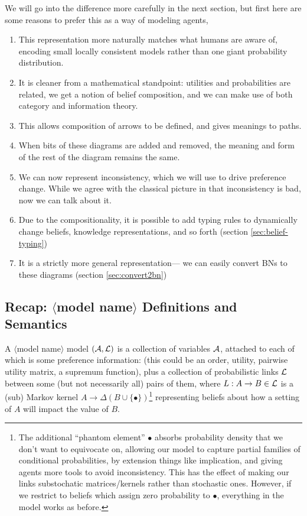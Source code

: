 \documentclass{article}
\newcommand\modelname{{\color{green!50!black}$\langle$model name$\rangle$ }}
\begin{document}
	We will go into the difference more carefully in the next section, but first here are some reasons to prefer this as a way of modeling agents,%
	
	\begin{enumerate}[nosep]
		\item This representation more naturally matches what humans are aware of, encoding small locally consistent models rather than one giant probability distribution.
		\item It is cleaner from a mathematical standpoint: utilities and probabilities are related, we get a notion of belief composition, and we can make use of both category and information theory.
		\item This allows composition of arrows to be defined, and gives meanings to paths. 
		\item When bits of these diagrams are added and removed, the meaning and form of the rest of the diagram remains the same.
		\item We can now represent inconsistency, which we will use to drive preference change. While we agree with the classical picture in that inconsistency is bad, now we can talk about it. 

		\item Due to the compositionality, it is possible to add typing rules to dynamically change beliefs, knowledge representations, and so forth (section \ref{sec:belief-typing})
		\item It is a strictly more general representation--- we can easily convert BNs to these diagrams (section \ref{sec:convert2bn})
	\end{enumerate}

	\subsection*{Recap: \modelname Definitions and Semantics}
	\begin{defn}
		A \modelname model $(\cal A, L)$ is a collection of variables $\cal A$, attached to each of which is some preference information: (this could be an order, utility, pairwise utility matrix, a supremum function), plus a collection of probabilistic links $\cal L$ between some (but not necessarily all) pairs of them, where $L: A\to B \in \cal L$ is a (sub) Markov kernel $A \to \Delta (B \cup \{\bullet\})$\footnote{The additional ``phantom element'' $\bullet$ absorbs probability density that we don't want to equivocate on, allowing our model to capture partial families of conditional probabilities, by extension things like implication, and giving agents more tools to avoid inconsistency. This has the effect of making our links substochatic matrices/kernels rather than stochastic ones. However, if we restrict to beliefs which assign zero probability to $\bullet$, everything in the model works as before.} representing beliefs about how a setting of $A$ will impact the value of $B$. 
	\end{defn}
\end{document}
